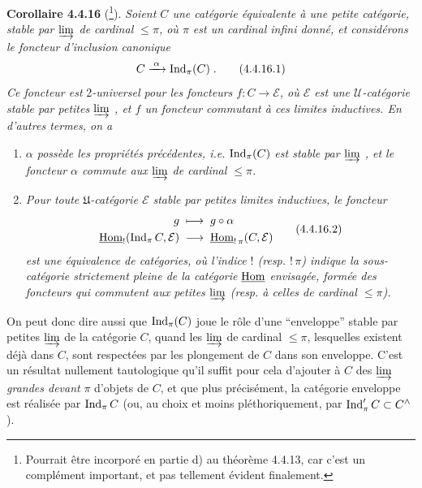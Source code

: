 \textbf{Corollaire 4.4.16} (\footnote{Pourrait être incorporé en partie d) au théorème 4.4.13, car c'est un complément important, et pas tellement évident finalement.}). \textit{Soient $C$ une catégorie équivalente à une petite catégorie, stable par $\varinjlim$ de cardinal $\leqslant\pi$, où $\pi$ est un cardinal infini donné, et considérons le foncteur d'inclusion canonique}
\[
C\xrightarrow{\;\alpha\;}\Ind_\pi(C)\;. \tag*{(4.4.16.1)}
\]
\textit{Ce foncteur est} 2\textit{-universel pour les foncteurs $f:C\longrightarrow\mathcal{E}$, où $\mathcal{E}$ est une $\mathcal{U}$-catégorie stable par petites $\varinjlim$ , et $f$ un foncteur commutant à ces limites inductives. En d'autres termes, on a}
\begin{enumerate}
\item[\textit{1$^\circ$)}] \textit{$\alpha$ possède les propriétés précédentes, i.e.} $\operatorname{Ind}_\pi(C)$ \textit{est stable par $\varinjlim$ , et le foncteur $\alpha$ commute aux $\varinjlim$ de cardinal $\leqslant\pi$.}
\item[\textit{2$^\circ$)}] \textit{Pour toute $\mathfrak{U}$-catégorie $\mathcal{E}$ stable par petites limites inductives, le foncteur}
\[
\begin{aligned}
g\;&\longmapsto\;g\circ\alpha\\
\uHom_{!}(\Ind_\pi C,\mathcal{E})\;&\longrightarrow\;\uHom_{!\,\pi}(C,\mathcal{E})
\end{aligned}
\tag*{(4.4.16.2)}
\]
\textit{est une équivalence de catégories, où l'indice $!$ (resp. $!\,\pi$) indique la sous-catégorie strictement pleine de la catégorie} $\underline{\mathrm{Hom}}$
\textit{envisagée, formée des foncteurs qui commutent aux petites $\varinjlim$ (resp. à celles de cardinal $\leqslant\pi$).}
\end{enumerate}

On peut donc dire aussi que $\operatorname{Ind}_\pi(C)$ joue le rôle d'une “enveloppe” stable par petites $\varinjlim$ de la catégorie $C$, quand les $\varinjlim$ de cardinal $\leqslant\pi$, lesquelles existent déjà dans $C$, sont respectées par les plongement de $C$ dans son enveloppe. C'est un résultat nullement tautologique qu'il suffit pour cela d'ajouter à $C$ des $\varinjlim$ \textit{grandes devant} $\pi$ d'objets de $C$, et que plus précisément, la catégorie enveloppe est réalisée par $\operatorname{Ind}_\pi C$ (ou, au choix et moins pléthoriquement, par $\operatorname{Ind}'_\pi C\subset C^\wedge$). %

